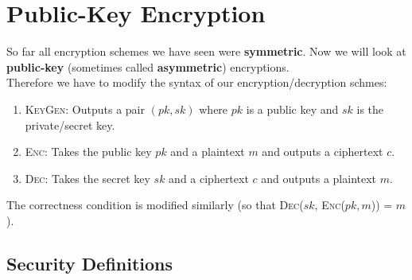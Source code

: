 \documentclass{article}
\begin{document}
		\section{Public-Key Encryption}
		\begin{adjustwidth}{2em}{2em}
			So far all encryption schemes we have seen were \textbf{symmetric}. Now we will look at \textbf{public-key} (sometimes called \textbf{asymmetric}) encryptions. \\
			Therefore we have to modify the syntax of our encryption/decryption schmes:
			\begin{enumerate}
				\item \textsc{KeyGen:} Outputs a pair $(pk,sk)$ where $pk$ is a public key and $sk$ is the private/secret key.
				\item \textsc{Enc:} Takes the public key $pk$ and a plaintext $m$ and outputs a ciphertext $c$.
				\item \textsc{Dec:} Takes the secret key $sk$ and a ciphertext $c$ and outputs a plaintext $m$.
			\end{enumerate}
			The correctness condition is modified similarly (so that \textsc{Dec}($sk$, \textsc{Enc}($pk, m$)) = $m$).
			\subsection{Security Definitions}
			\begin{adjustwidth}{2em}{2em}

\end{adjustwidth}
\end{adjustwidth}
\end{document}
